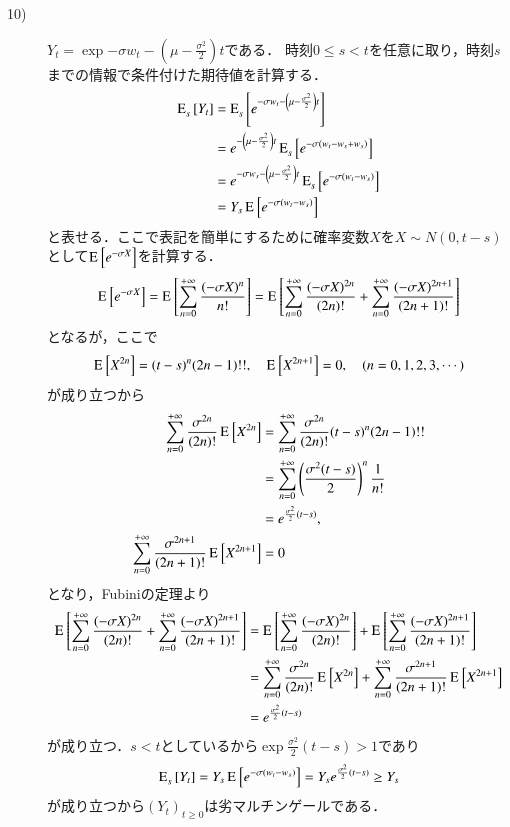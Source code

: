 \begin{prf}
\begin{description}
	\item[10)] 
		$Y_t = \exp{-\sigma w_t - \left(\mu - \frac{\sigma^2}{2}\right)t}$である．
		時刻$0 \leq s < t$を任意に取り，時刻$s$までの情報で条件付けた期待値を計算する．
		\begin{align}
			\Exp{Y_t}{s}{} &= \Exp{\exp{-\sigma w_t - \left(\mu - \frac{\sigma^2}{2}\right)t}}{s}{} \\
			&= \exp{- \left(\mu - \frac{\sigma^2}{2}\right)t} \Exp{\exp{-\sigma (w_t - w_s + w_s)}}{s}{} \\
			&= \exp{-\sigma w_s - \left(\mu - \frac{\sigma^2}{2}\right)t} \Exp{\exp{-\sigma (w_t - w_s)}}{s}{} \\
			&= Y_s \Exp{\exp{-\sigma (w_t - w_s)}}{}{}
		\end{align}
		と表せる．ここで表記を簡単にするために確率変数$X$を$X \sim N(0, t-s)$として$\Exp{\exp{-\sigma X}}{}{}$を計算する．
		\begin{align}
			\Exp{\exp{-\sigma X}}{}{} = \Exp{\sum_{n=0}^{+\infty} \frac{(-\sigma X)^n}{n!}}{}{} 
			= \Exp{\sum_{n=0}^{+\infty} \frac{(-\sigma X)^{2n}}{(2n)!} + \sum_{n=0}^{+\infty} \frac{(-\sigma X)^{2n+1}}{(2n+1)!}}{}{} 
		\end{align}
		となるが，ここで
		\begin{align}
			\Exp{X^{2n}}{}{} = (t-s)^n (2n-1)!!, \quad \Exp{X^{2n + 1}}{}{} = 0, \quad (n = 0,1,2,3,\cdots)
		\end{align}
		が成り立つから
		\begin{align}
			\sum_{n=0}^{+\infty} \frac{\sigma^{2n}}{(2n)!} \Exp{X^{2n}}{}{} 
			&= \sum_{n=0}^{+\infty} \frac{\sigma^{2n}}{(2n)!} (t-s)^n (2n-1)!! \\
			&= \sum_{n=0}^{+\infty} \left(\frac{\sigma^2(t-s)}{2}\right)^n \frac{1}{n!} \\
			&= \exp{\frac{\sigma^2}{2}(t-s)}, \\
			\sum_{n=0}^{+\infty} \frac{\sigma^{2n+1}}{(2n+1)!} \Exp{X^{2n+1}}{}{} &= 0
		\end{align}
		となり，Fubiniの定理より
		\begin{align}
			\Exp{\sum_{n=0}^{+\infty} \frac{(-\sigma X)^{2n}}{(2n)!} + \sum_{n=0}^{+\infty} \frac{(-\sigma X)^{2n+1}}{(2n+1)!}}{}{}
			&= \Exp{\sum_{n=0}^{+\infty} \frac{(-\sigma X)^{2n}}{(2n)!}}{}{}
			+ \Exp{\sum_{n=0}^{+\infty} \frac{(-\sigma X)^{2n+1}}{(2n+1)!}}{}{} \\
			&= \sum_{n=0}^{+\infty} \frac{\sigma^{2n}}{(2n)!} \Exp{X^{2n}}{}{}
			+ \sum_{n=0}^{+\infty} \frac{\sigma^{2n+1}}{(2n+1)!} \Exp{X^{2n+1}}{}{} \\
			&= \exp{\frac{\sigma^2}{2}(t-s)}
		\end{align}
		が成り立つ．$s < t$としているから$\exp{\frac{\sigma^2}{2}(t-s)} > 1$であり
		\begin{align}
			\Exp{Y_t}{s}{} = Y_s \Exp{\exp{-\sigma (w_t - w_s)}}{}{} = Y_s\exp{\frac{\sigma^2}{2}(t-s)} \geq Y_s
		\end{align}
		が成り立つから$(Y_t)_{t \geq 0}$は劣マルチンゲールである．
		\QED
\end{description}
\end{prf}